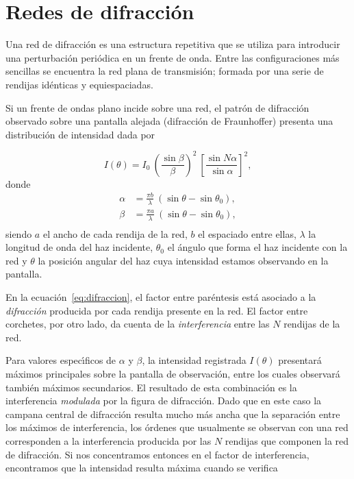 \documentclass[laboratorio]{guia}
\begin{document}
\maketitle

\section{Redes de difracci\'on}

Una red de difracci\'on es una estructura repetitiva que se utiliza para
introducir una perturbaci\'on peri\'odica en un frente de onda. Entre las
configuraciones m\'as sencillas se encuentra la red plana de transmisi\'on;
formada por una serie de rendijas id\'enticas y equiespaciadas. 

Si un frente de ondas plano incide sobre una red, el patr\'on de difracci\'on
observado sobre una pantalla alejada (difracci\'on de Fraunhoffer) presenta
una distribuci\'on de intensidad dada por

\begin{equation}
    I(\theta) = I_0 \: \left( \frac{\sin \beta}{\beta} \right)^2 \: 
    \left[ \frac{\sin N\alpha}{\sin \alpha}\right]^2,
    \label{eq:difraccion}
\end{equation}
donde 
\begin{align*}
    \alpha &= \frac{\pi b}{\lambda} \: 
    \left(\sin \theta - \sin \theta_0 \right), \\
    \beta  &= \frac{\pi a}{\lambda} \: 
    \left(\sin \theta - \sin \theta_0 \right), \\
\end{align*}
siendo $a$ el ancho de cada rendija de la red, $b$ el espaciado entre ellas,
$\lambda$ la longitud de onda del haz incidente, 
$\theta_0$ el \'angulo que forma el haz incidente con la red y $\theta$ la
posici\'on angular del haz cuya intensidad estamos observando en la pantalla.

En la ecuaci\'on~\eqref{eq:difraccion}, el factor entre par\'entesis 
est\'a asociado a la {\it difracci\'on} producida por cada rendija
presente en la red. El factor entre corchetes, por otro lado, da cuenta de la 
{\it interferencia} entre las $N$ rendijas de la red. 

Para valores espec\'\i ficos de $\alpha$ y $\beta$, la intensidad registrada
$I(\theta)$ presentar\'a m\'aximos principales sobre la pantalla de 
observaci\'on, entre los cuales observar\'a tambi\'en m\'aximos secundarios.
El resultado de esta combinaci\'on es la interferencia {\it modulada} por
la figura de difracci\'on. Dado que en este caso la campana central de 
difracci\'on resulta mucho m\'as ancha que la separaci\'on entre los m\'aximos
de interferencia, los \'ordenes que usualmente se observan con una red 
corresponden a la interferencia producida por las $N$ rendijas que componen
la red de difracci\'on. Si nos concentramos entonces en el factor de 
interferencia, encontramos que la intensidad resulta m\'axima cuando se
verifica
\end{document}
